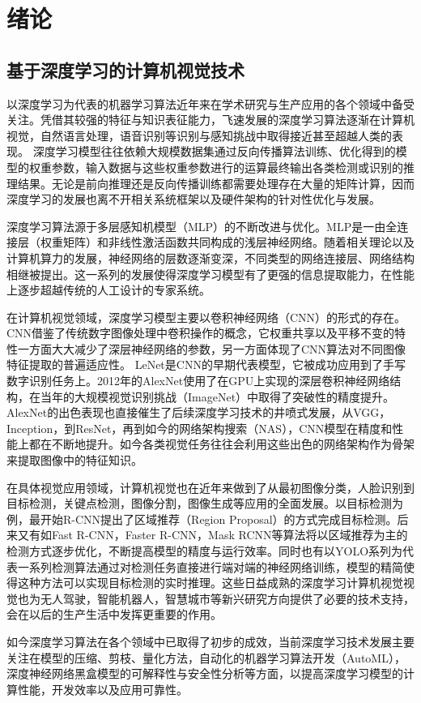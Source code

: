 
\chapter{绪论}

\section{基于深度学习的计算机视觉技术}
以深度学习为代表的机器学习算法近年来在学术研究与生产应用的各个领域中备受关注。凭借其较强的特征与知识表征能力，飞速发展的深度学习算法逐渐在计算机视觉，自然语言处理，语音识别等识别与感知挑战中取得接近甚至超越人类的表现。%
深度学习模型往往依赖大规模数据集通过反向传播算法训练、优化得到的模型的权重参数，输入数据与这些权重参数进行的运算最终输出各类检测或识别的推理结果。无论是前向推理还是反向传播训练都需要处理存在大量的矩阵计算，因而深度学习的发展也离不开相关系统框架以及硬件架构的针对性优化与发展。\par
深度学习算法源于多层感知机模型（MLP）的不断改进与优化。MLP是一由全连接层（权重矩阵）和非线性激活函数共同构成的浅层神经网络。随着相关理论以及计算机算力的发展，神经网络的层数逐渐变深，不同类型的网络连接层、网络结构相继被提出。这一系列的发展使得深度学习模型有了更强的信息提取能力，在性能上逐步超越传统的人工设计的专家系统。\par
在计算机视觉领域，深度学习模型主要以卷积神经网络（CNN）的形式的存在。CNN借鉴了传统数字图像处理中卷积操作的概念，它权重共享以及平移不变的特性一方面大大减少了深层神经网络的参数，另一方面体现了CNN算法对不同图像特征提取的普遍适应性。
LeNet是CNN的早期代表模型，它被成功应用到了手写数字识别任务上。2012年的AlexNet使用了在GPU上实现的深层卷积神经网络结构，在当年的大规模视觉识别挑战（ImageNet）中取得了突破性的精度提升。AlexNet的出色表现也直接催生了后续深度学习技术的井喷式发展，从VGG，Inception，到ResNet，再到如今的网络架构搜索（NAS），CNN模型在精度和性能上都在不断地提升。如今各类视觉任务往往会利用这些出色的网络架构作为骨架来提取图像中的特征知识。\par
在具体视觉应用领域，计算机视觉也在近年来做到了从最初图像分类，人脸识别到目标检测，关键点检测，图像分割，图像生成等应用的全面发展。以目标检测为例，最开始R-CNN提出了区域推荐（Region Proposal）的方式完成目标检测。后来又有如Fast R-CNN，Faster R-CNN，Mask RCNN等算法将以区域推荐为主的检测方式逐步优化，不断提高模型的精度与运行效率。同时也有以YOLO系列为代表一系列检测算法通过对检测任务直接进行端对端的神经网络训练，模型的精简使得这种方法可以实现目标检测的实时推理。这些日益成熟的深度学习计算机视觉视觉也为无人驾驶，智能机器人，智慧城市等新兴研究方向提供了必要的技术支持，会在以后的生产生活中发挥更重要的作用。\par
如今深度学习算法在各个领域中已取得了初步的成效，当前深度学习技术发展主要关注在模型的压缩、剪枝、量化方法，自动化的机器学习算法开发（AutoML），深度神经网络黑盒模型的可解释性与安全性分析等方面，以提高深度学习模型的计算性能，开发效率以及应用可靠性。

